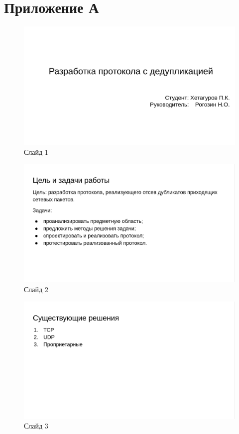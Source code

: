 \documentclass[14pt, a4paper]{extarticle}
\begin{document}
\clearpage
\section*{Приложение А}
\begin{figure}[H]
	\centering
	\includegraphics[scale=0.4]{pr1.png}
	\caption{Слайд 1}
\end{figure}
\begin{figure}[H]
	\centering
	\includegraphics[scale=0.4]{pr2.png}
	\caption{Слайд 2}
\end{figure}
\begin{figure}[H]
	\centering
	\includegraphics[scale=0.4]{pr3.png}
		\caption{Слайд 3}
\end{figure}
\end{document}

